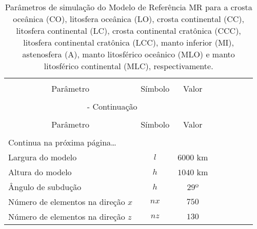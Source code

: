 \begin{center}
    \setcaptionmargin{1cm}
    \scriptsize
    \begin{longtable}{lccccccc}
        \caption[Parâmetros de simulação do MR.]{Parâmetros de simulação do Modelo de Referência MR para a crosta oceânica (CO), litosfera oceânica (LO), crosta continental (CC), litosfera continental (LC), crosta continental cratônica (CCC), litosfera continental cratônica (LCC), manto inferior (MI), astenosfera (A), manto litosférico oceânico (MLO) e manto litosférico continental (MLC), respectivamente.}\\
        \hline \hline \\[-2ex]
        \multicolumn{1}{c}{Parâmetro} &
        \multicolumn{1}{c}{Símbolo} &
        \multicolumn{1}{c}{Valor} &

        \\[0.5ex] \hline
        \\[-1.8ex]
        
        \endfirsthead
        
        \multicolumn{4}{c}{\footnotesize{{\slshape{{\tablename} \thetable{}}} - Continuação}}\\[0.5ex]
        
        \hline \hline\\[-2ex]
        
        \multicolumn{1}{c}{Parâmetro} &
        \multicolumn{1}{c}{Símbolo} &
        \multicolumn{1}{c}{Valor} &
        
        \\[0.5ex] \hline
        \\[-1.8ex]
        
        \endhead
        
        \multicolumn{5}{l}{{\footnotesize{Continua na próxima página\ldots}}}\\
        \endfoot
        \hline
        
        \endlastfoot

        Largura do modelo & $l$ & $6000$ km \\
        Altura do modelo & $h$ & $1040$ km \\
        Ângulo de subdução & $h$ & $29$º \\

        Número de elementos na direção $x$ & $nx$ & $750$\\
        Número de elementos na direção $z$ & $nz$ & $130$ \\


\end{longtable}
\end{center}
